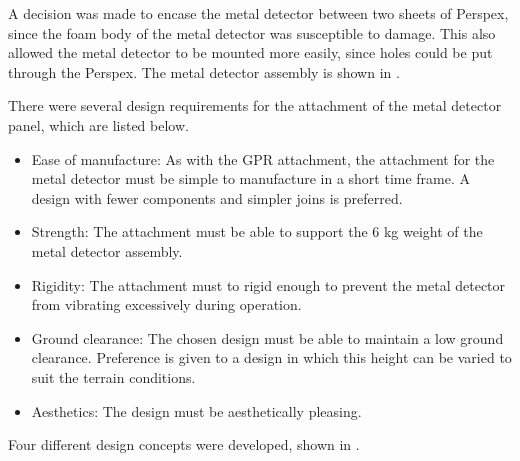 \documentclass[main.tex]{subfiles}
\begin{document}
A decision was made to encase the metal detector between two sheets of Perspex, since the foam body of the metal detector was susceptible to damage. This also allowed the metal detector to be mounted more easily, since holes could be put through the Perspex. The metal detector assembly is shown in .

There were several design requirements for the attachment of the metal detector panel, which are listed below. 

\begin{itemize}
\item Ease of manufacture: As with the GPR attachment, the attachment for the metal detector must be simple to manufacture in a short time frame. A design with fewer components and simpler joins is preferred.
\item Strength: The attachment must be able to support the 6 kg weight of the metal detector assembly. 
\item Rigidity: The attachment must to rigid enough to prevent the metal detector from vibrating excessively during operation.   
\item Ground clearance: The chosen design must be able to maintain a low ground clearance. Preference is given to a design in which this height can be varied to suit the terrain conditions. 
\item Aesthetics: The design must be aesthetically pleasing. 
\end{itemize}

Four different design concepts were developed, shown in .
\end{document}
